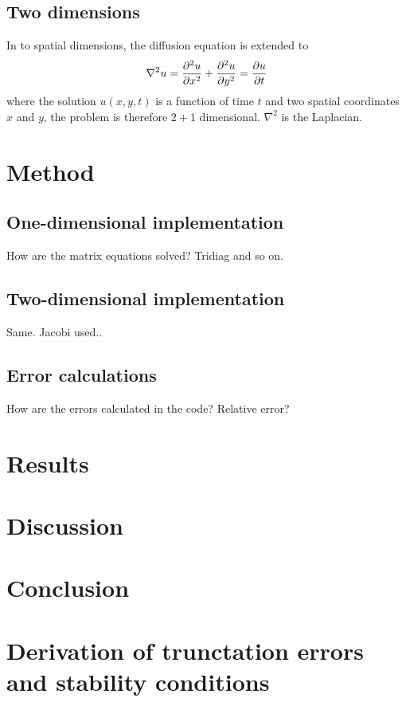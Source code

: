 \documentclass[aps,reprint]{revtex4-1}
\newcommand\blankpage{%
  \null
  \thispagestyle{empty}%
  \addtocounter{page}{-1}%
  \newpage}
\begin{document}
\subsection{Two dimensions}
In to spatial dimensions, the diffusion equation is extended to
\begin{align}
  \nabla^2 u = \pdv[2]{u}{x} + \pdv[2]{u}{y} = \pdv{u}{t}
\end{align}
where the solution $u(x,y,t)$ is a function of time $t$ and two spatial coordinates $x$ and $y$,
the problem is therefore $2 + 1$ dimensional. $\nabla^2$ is the Laplacian.
\section{Method} \label{sec:method}
\subsection{One-dimensional implementation}
How are the matrix equations solved? Tridiag and so on.
\subsection{Two-dimensional implementation}
Same. Jacobi used..
\subsection{Error calculations}
How are the errors calculated in the code? Relative error?
\section{Results} \label{sec:results}
\section{Discussion} \label{sec:discussion}
\section{Conclusion} \label{sec:conclusion}

\blankpage
\appendix
\section{Derivation of trunctation errors and stability conditions} \label{sec:errors}
\blankpage
\end{document}
